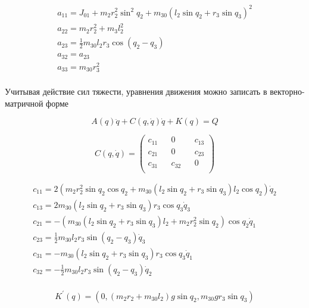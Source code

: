   \begin{equation*}
  \begin{array}{l}
  a_{11} = J_{01} + m_2 r_2^2 \sin^2 q_2 + m_{30} (l_2 \sin q_2 + r_3 \sin q_3)^2 \\
  a_{22} = m_2 r_2^2 + m_3 l_2^2 \\
  a_{23} = \frac12 m_{30} l_2 r_3 \cos(q_2 - q_3) \\
  a_{32} = a_{23} \\
  a_{33} = m_{30} r_3^2 \\
  \end{array}
  \end{equation*}
  
  Учитывая действие сил тяжести, уравнения движения можно записать в векторно-матричной форме
    
  \begin{equation}
  A(q) \ddot q + C(q, \dot q) \dot q + K(q) = Q \label{chain3_matrix_form}
  \end{equation}
    
  \begin{equation*}
  C(q, \dot q)= 
  \begin{pmatrix}
  c_{11} && 0 && c_{13} \\
  c_{21} && 0 && c_{23} \\
  c_{31} && c_{32} && 0\\
  \end{pmatrix}
  \end{equation*} 
        
   \begin{equation*}
   \begin{array}{l}
   c_{11} = 2 (m_2 r_2^2 \sin q_2 \cos q_2 + m_{30} (l_2 \sin q_2 + r_3 \sin q_3) l_2 \cos q_2) \dot q_2 \\
   c_{13} = 2 m_{30} (l_2 \sin q_2 + r_3 \sin q_3) r_3 \cos q_3 \dot q_3 \\
   c_{21} = - (m_{30} (l_2 \sin q_2 + r_3 \sin q_3) l_2 + m_2 r_2^2 \sin q_2) \cos q_2 \dot q_1 \\
   c_{23} = \frac12 m_{30} l_2 r_3 \sin(q_2 - q_3) \dot q_3 \\
   c_{31} = - m_{30} (l_2 \sin q_2 + r_3 \sin q_3) r_3 \cos q_3 \dot q_1 \\
   c_{32} = - \frac12 m_{30} l_2 r_3 \sin (q_2 - q_3) \dot q_2 \\
   \end{array}
   \end{equation*}
 
 
   \begin{equation*}
   K^{'} (q) = (0, (m_2 r_2 + m_{30} l_2) g \sin q_2, m_{30} g r_3 \sin q_3)
   \end{equation*}
 
